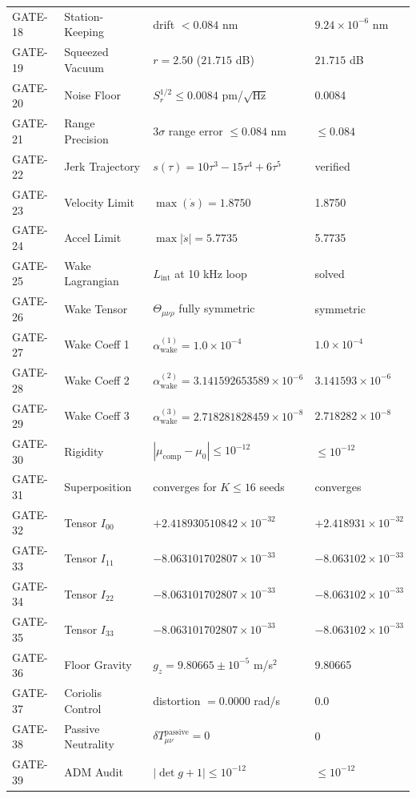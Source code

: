 \documentclass[twocolumn,aps,pra,floatfix,superscriptaddress,10pt]{revtex4-2}
\begin{document}
\begin{longtable}{llll}
GATE-18 & Station-Keeping & drift $< 0.084$ nm & $9.24\times10^{-6}$ nm \\
GATE-19 & Squeezed Vacuum & $r = 2.50$ ($21.715$ dB) & $21.715$ dB \\
GATE-20 & Noise Floor & $S_r^{1/2} \le 0.0084$ pm/$\sqrt{\mathrm{Hz}}$ & 0.0084 \\
GATE-21 & Range Precision & $3\sigma$ range error $\le 0.084$ nm & $\le 0.084$ \\
GATE-22 & Jerk Trajectory & $s(\tau) = 10\tau^3-15\tau^4+6\tau^5$ & verified \\
GATE-23 & Velocity Limit & $\max(\dot{s}) = 1.8750$ & 1.8750 \\
GATE-24 & Accel Limit & $\max|\ddot{s}| = 5.7735$ & 5.7735 \\
GATE-25 & Wake Lagrangian & $L_{\text{int}}$ at 10 kHz loop & solved \\
GATE-26 & Wake Tensor & $\Theta_{\mu\nu\rho}$ fully symmetric & symmetric \\
GATE-27 & Wake Coeff 1 & $\alpha_{\text{wake}}^{(1)} = 1.0\times10^{-4}$ & $1.0\times10^{-4}$ \\
GATE-28 & Wake Coeff 2 & $\alpha_{\text{wake}}^{(2)} = 3.141592653589\times10^{-6}$ & $3.141593\times10^{-6}$ \\
GATE-29 & Wake Coeff 3 & $\alpha_{\text{wake}}^{(3)} = 2.718281828459\times10^{-8}$ & $2.718282\times10^{-8}$ \\
GATE-30 & Rigidity & $|\mu_{\text{comp}}-\mu_0| \le 10^{-12}$ & $\le 10^{-12}$ \\
GATE-31 & Superposition & converges for $K \le 16$ seeds & converges \\
GATE-32 & Tensor $I_{00}$ & $+2.418930510842\times10^{-32}$ & $+2.418931\times10^{-32}$ \\
GATE-33 & Tensor $I_{11}$ & $-8.063101702807\times10^{-33}$ & $-8.063102\times10^{-33}$ \\
GATE-34 & Tensor $I_{22}$ & $-8.063101702807\times10^{-33}$ & $-8.063102\times10^{-33}$ \\
GATE-35 & Tensor $I_{33}$ & $-8.063101702807\times10^{-33}$ & $-8.063102\times10^{-33}$ \\
GATE-36 & Floor Gravity & $g_z = 9.80665 \pm 10^{-5}$ m/s$^2$ & 9.80665 \\
GATE-37 & Coriolis Control & distortion $= 0.0000$ rad/s & 0.0 \\
GATE-38 & Passive Neutrality & $\delta T_{\mu\nu}^{\text{passive}} = 0$ & 0 \\
GATE-39 & ADM Audit & $|\det g + 1| \le 10^{-12}$ & $\le 10^{-12}$ \\

\end{longtable}
\end{document}
